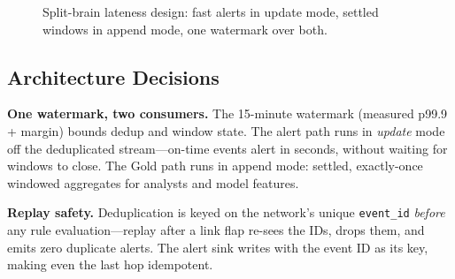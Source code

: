 \begin{figure}[H]
    \centering
    \caption{Split-brain lateness design: fast alerts in update mode, settled windows in append mode, one watermark over both.}
    \label{fig:ch14-fraud}
\end{figure}

\subsection{Architecture Decisions}
\textbf{One watermark, two consumers.} The 15-minute watermark (measured p99.9 + margin) bounds dedup and window state. The alert path runs in \emph{update} mode off the deduplicated stream---on-time events alert in seconds, without waiting for windows to close. The Gold path runs in append mode: settled, exactly-once windowed aggregates for analysts and model features.

\textbf{Replay safety.} Deduplication is keyed on the network's unique \texttt{event\_id} \emph{before} any rule evaluation---replay after a link flap re-sees the IDs, drops them, and emits zero duplicate alerts. The alert sink writes with the event ID as its key, making even the last hop idempotent.

